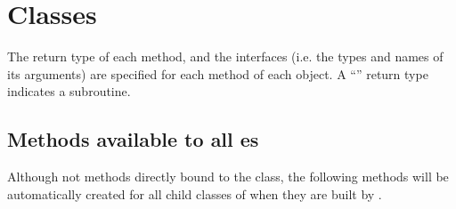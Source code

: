 \section{Classes}
 
The return type of each method, and the interfaces (i.e. the types and names of its arguments) are specified for each method of each object. A ``'' return type indicates a subroutine.

\subsection{Methods available to all es}\label{sec:functionClassAll}

Although not methods directly bound to the  class, the following methods will be automatically created for all child classes of  when they are built by \glc.


